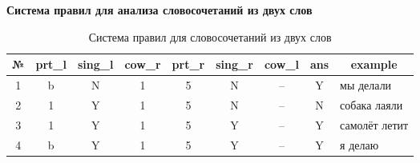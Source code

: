\documentclass[main]{subfiles}
\begin{document}
\begin{center}

	\appendix	\textbf{Система правил для анализа словосочетаний из двух слов}\label{app5}

	
\end{center}

\begin{table}[!h]
	\begin{center}
		\captionsetup{format=hang,labelsep = endash, singlelinecheck=false}
	\caption{Система правил для словосочетаний из двух слов}
		\begin{tabular}{|c|c|c|c|c|c|c|c|l|}
			\hline
			\textbf{№} & \textbf{prt\_l} &\textbf{ sing\_l}  & \textbf{cow\_r} & \textbf{prt\_r }& \textbf{sing\_r} & \textbf{cow\_l} & \textbf{ans}  & \multicolumn{1}{c|}{\textbf{example}} \\ \hline
			1 & b & N & 1 & 5 & N & --  & Y  & мы делали \\ \hline
			2 &  1 &Y & 1 & 5 & N & -- & N & собака лаяли\\ \hline
			3 & 1 & Y & 1 & 5 & Y & -- & Y & самолёт летит\\ \hline 
			4 & b & Y & 1 & 5 & Y & -- & Y & я делаю \\ \hline
		\end{tabular}
	\end{center}
\end{table}
\end{document}

